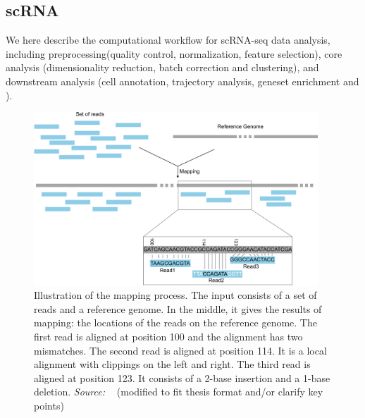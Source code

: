 \subsection{scRNA}
We here describe the computational workflow for scRNA-seq data analysis, including preprocessing(quality control, normalization, feature selection), core analysis (dimensionality reduction, batch correction and clustering), and downstream analysis (cell annotation, trajectory analysis, geneset enrichment and ).
\begin{figure}[!ht]
	\centering
	\includegraphics[width=0.95\textwidth]{alignment/fig}
	\vspace{0.1cm}
	\caption[alignment.]{ Illustration of the mapping process. The input consists of a set of reads and a reference genome. In the middle, it gives the results of mapping: the locations of the reads on the reference genome. The first read is aligned at position 100 and the alignment has two mismatches. The second read is aligned at position 114. It is a local alignment with clippings on the left and right. The third read is aligned at position 123. It consists of a 2-base insertion and a 1-base deletion. \emph{Source: ~\cite{galaxyprojectSequenceAnalysis2016alignment}} (modified to fit thesis format and/or clarify key points)}
	\label{fig:alignment}
\end{figure}


